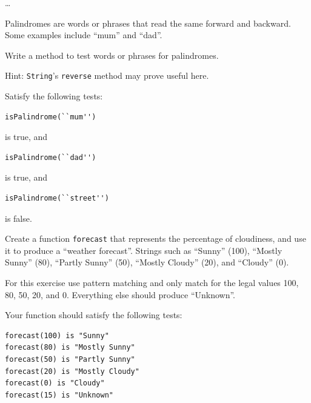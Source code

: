 \documentclass[12pt,a4paper]{exam}
\begin{document}
\begin{questions}
\begin{parts}
\begin{solution}
	\ldots	
\end{solution}
\end{parts}

\question
Palindromes are words or phrases that read the same forward and
backward. Some examples include ``mum'' and ``dad''. 

Write a method to test words or phrases for palindromes. 

Hint: \verb!String!'s \verb!reverse! method may prove useful here. 

Satisfy the following tests: 
\begin{Verbatim}
isPalindrome(``mum'') 
\end{Verbatim}
is true, and 
\begin{Verbatim}
isPalindrome(``dad'')
\end{Verbatim}
is true, and 
\begin{Verbatim}
isPalindrome(``street'')
\end{Verbatim}
is false.

\begin{solution}
	
\end{solution}

\question
Create a function \verb!forecast! that represents the percentage of cloudiness,
and use it to produce a ``weather forecast''. Strings such as ``Sunny''
(100), ``Mostly Sunny'' (80), ``Partly Sunny'' (50), ``Mostly Cloudy''
(20), and ``Cloudy'' (0). 

For this exercise use pattern matching and only match for the legal
values 100, 80, 50, 20, and 0. Everything else should produce
``Unknown''.

Your function should satisfy the following tests:
\begin{Verbatim}
forecast(100) is "Sunny" 
forecast(80) is "Mostly Sunny" 
forecast(50) is "Partly Sunny" 
forecast(20) is "Mostly Cloudy" 
forecast(0) is "Cloudy" 
forecast(15) is "Unknown"
\end{Verbatim}

\begin{solution}
	
\end{solution}

\question
{}
\end{questions}
\end{document}

